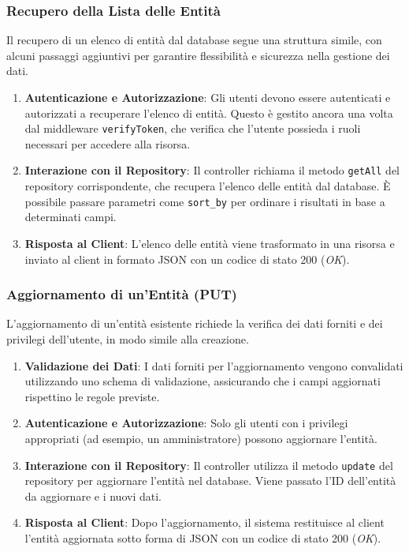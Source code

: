 \documentclass[twoside]{supsistudent}
\begin{document}
\subsubsection{Recupero della Lista delle Entità}

Il recupero di un elenco di entità dal database segue una struttura simile, con alcuni passaggi aggiuntivi per garantire flessibilità e sicurezza nella gestione dei dati.

\begin{enumerate}
  \item \textbf{Autenticazione e Autorizzazione}: Gli utenti devono essere autenticati e autorizzati a recuperare l'elenco di entità. Questo è gestito ancora una volta dal middleware \texttt{verifyToken}, che verifica che l'utente possieda i ruoli necessari per accedere alla risorsa.
  \item \textbf{Interazione con il Repository}: Il controller richiama il metodo \texttt{getAll} del repository corrispondente, che recupera l'elenco delle entità dal database. È possibile passare parametri come \texttt{sort\_by} per ordinare i risultati in base a determinati campi.
  \item \textbf{Risposta al Client}: L'elenco delle entità viene trasformato in una risorsa e inviato al client in formato JSON con un codice di stato 200 (\textit{OK}).
\end{enumerate}

\subsubsection{Aggiornamento di un'Entità (PUT)}

L'aggiornamento di un'entità esistente richiede la verifica dei dati forniti e dei privilegi dell'utente, in modo simile alla creazione.

\begin{enumerate}
  \item \textbf{Validazione dei Dati}: I dati forniti per l'aggiornamento vengono convalidati utilizzando uno schema di validazione, assicurando che i campi aggiornati rispettino le regole previste.
  \item \textbf{Autenticazione e Autorizzazione}: Solo gli utenti con i privilegi appropriati (ad esempio, un amministratore) possono aggiornare l'entità.
  \item \textbf{Interazione con il Repository}: Il controller utilizza il metodo \texttt{update} del repository per aggiornare l'entità nel database. Viene passato l'ID dell'entità da aggiornare e i nuovi dati.
  \item \textbf{Risposta al Client}: Dopo l'aggiornamento, il sistema restituisce al client l'entità aggiornata sotto forma di JSON con un codice di stato 200 (\textit{OK}).
\end{enumerate}
\end{document}

